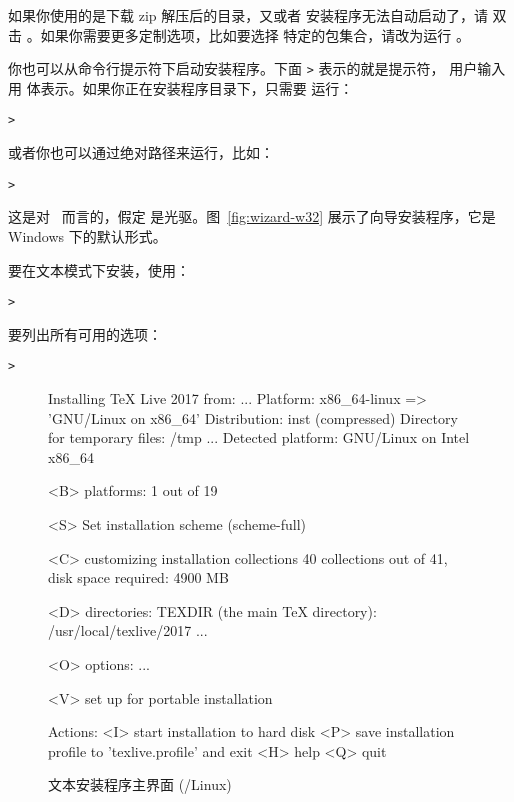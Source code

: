 \documentclass{article}
\begin{document}
如果你使用的是下载 zip 解压后的目录，又或者 \DVD 安装程序无法自动启动了，请
双击 。如果你需要更多定制选项，比如要选择
特定的包集合，请改为运行 。

你也可以从命令行提示符下启动安装程序。下面 \texttt{>} 表示的就是提示符，
用户输入用  体表示。如果你正在安装程序目录下，只需要
运行：
\begin{alltt}
> 
\end{alltt}

或者你也可以通过绝对路径来运行，比如：
\begin{alltt}
> 
\end{alltt}
这是对 \TK\ \DVD 而言的，假定  是光驱。图~\ref{fig:wizard-w32}
展示了向导安装程序，它是 Windows 下的默认形式。

要在文本模式下安装，使用：
\begin{alltt}
> 
\end{alltt}

要列出所有可用的选项：
\begin{alltt}
> 
\end{alltt}

\begin{figure}[tb]
\begin{boxedverbatim}
Installing TeX Live 2017 from: ...
Platform: x86_64-linux => 'GNU/Linux on x86_64'
Distribution: inst (compressed)
Directory for temporary files: /tmp
...
 Detected platform: GNU/Linux on Intel x86_64

 <B> platforms: 1 out of 19

 <S> Set installation scheme (scheme-full)

 <C> customizing installation collections
     40 collections out of 41, disk space required: 4900 MB

 <D> directories:
   TEXDIR (the main TeX directory):
     /usr/local/texlive/2017
   ...

 <O> options:
   ...

 <V> set up for portable installation

Actions:
 <I> start installation to hard disk
 <P> save installation profile to 'texlive.profile' and exit
 <H> help
 <Q> quit
\end{boxedverbatim}
\caption{文本安装程序主界面 (\GNU/Linux)}\label{fig:text-main}
\end{figure}
\end{document}
